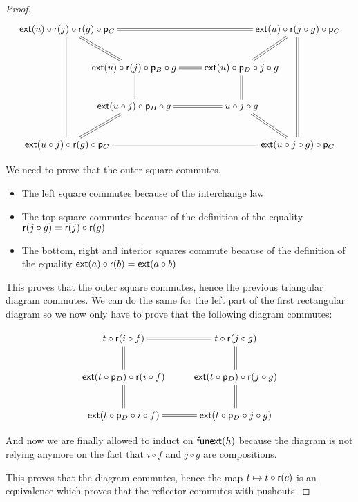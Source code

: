 \begin{proof}
  \[\xymatrix@C=-30pt{
    \extend{u}\circ\reflect(j)\circ\reflect(g)\circ\project_C
      \ar@{=}[rrrr] \ar@{=}[ddd] \ar@{=}[rd] & & & &
    \extend{u}\circ\reflect(j\circ g)\circ\project_C
      \ar@{=}[ld] \ar@{=}[ddd] \\ &
    \extend{u}\circ\reflect(j)\circ\project_B\circ g
      \ar@{=}[rr] \ar@{=}[d] & {\phantom{thisisanuglyhack}} &
    \extend{u}\circ\project_D\circ j\circ g
      \ar@{=}[d] & \\ &
    \extend{u\circ j}\circ\project_B\circ g
      \ar@{=}[rr] \ar@{=}[ld] & &
    u\circ j\circ g
      \ar@{=}[rd] & \\
    \extend{u\circ j}\circ\reflect(g)\circ\project_C
      \ar@{=}[rrrr] & & & &
    \extend{u\circ j\circ g}\circ\project_C
  }\]

  We need to prove that the outer square commutes.

  \begin{itemize}
  \item The left square commutes because of the interchange law
  \item The top square commutes because of the definition of the equality
    $\mathsf{r}(j\circ g)=\mathsf{r}(j)\circ\mathsf{r}(g)$
  \item The bottom, right and interior squares commute because of the definition
    of the equality $\mathsf{ext}(a)\circ\mathsf{r}(b)=\mathsf{ext}(a\circ b)$
  \end{itemize}

  This proves that the outer square commutes, hence the previous triangular
  diagram commutes. We can do the same for the left part of the first
  rectangular diagram so we now only have to prove that the following diagram
  commutes:

  \[\xymatrix{
    t\circ\reflect(i\circ f) \ar@{=}[r] \ar@{=}[d] &
      t\circ\reflect(j\circ g) \ar@{=}[d] \\
    \extend{t\circ\project_D}\circ\reflect(i\circ f) \ar@{=}[d] &
      \extend{t\circ\project_D}\circ\reflect(j\circ g) \ar@{=}[d] \\
    \extend{t\circ\project_D\circ i\circ f} \ar@{=}[r] &
      \extend{t\circ\project_D\circ j\circ g}\\
  }\]

  And now we are finally allowed to induct on $\mathsf{funext}(h)$ because the diagram
  is not relying anymore on the fact that $i\circ f$ and $j\circ g$ are
  compositions.

  \bigskip

  This proves that the diagram commutes, hence the map
  $t\mapsto{}t\circ\mathsf{r}(c)$ is an equivalence which proves that
  the reflector commutes with pushouts.
\end{proof}

